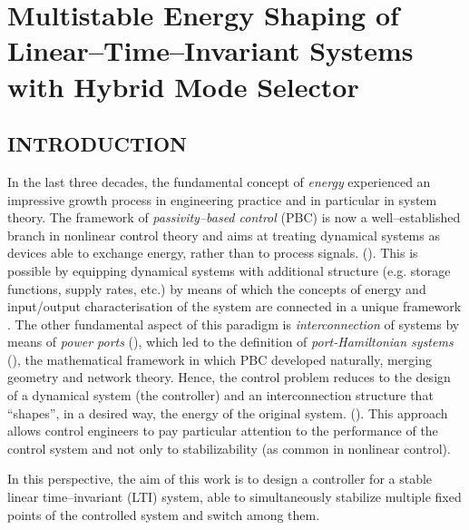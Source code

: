 
\chapter{Multistable Energy Shaping of Linear--Time--Invariant Systems with Hybrid Mode Selector}

\label{chap:multistable}
\minitoc

\thispagestyle{empty}

\newpage
\section{INTRODUCTION}
In the last three decades, the fundamental concept of \textit{energy} experienced an impressive growth process in engineering practice and in particular in system theory. The framework of \textit{passivity--based control} (PBC) is now a well--established branch in nonlinear control theory and aims at treating dynamical systems as devices able to exchange energy, rather than to process signals. (\cite{ortega2001putting}). 
This is possible by equipping dynamical systems with additional structure (e.g. storage functions, supply rates, etc.) by means of which the concepts of energy and input/output characterisation of the system are connected in a unique framework \cite{sontag2008input}.
The other fundamental aspect of this paradigm is \textit{interconnection} of systems by means of \textit{power ports} (\cite{duindam2009modeling}), which led to the definition of \textit{port-Hamiltonian systems} (\cite{MASCHKE1992359,ortega2001putting,van2014port}), the mathematical framework in which PBC developed naturally, merging geometry and network theory. Hence, the control problem reduces to the design of a dynamical system (the controller) and an interconnection
structure that ``shapes'', in a desired way, the energy of the original system. (\cite{ortega2001putting,ortega2008control}). This approach allows control engineers to pay particular attention to the performance of the control system and not only to stabilizability (as common in nonlinear control). 

In this perspective, the aim of this work is to design a controller for a stable linear time--invariant (LTI) system, able to simultaneously stabilize multiple fixed points of the controlled system and switch among them.

